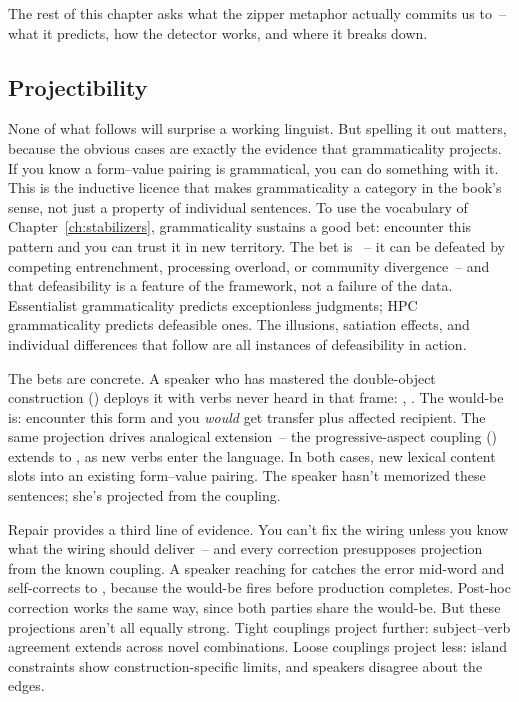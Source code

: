 The rest of this chapter asks what the zipper metaphor actually commits us to~-- what it predicts, how the detector works, and where it breaks down.


\subsection{Projectibility}
\label{sec:15:projectibility}
None of what follows will surprise a working linguist. But spelling it out matters, because the obvious cases are exactly the evidence that grammaticality projects. If you know a form--value pairing is grammatical, you can do something with it. This is the inductive licence that makes grammaticality a category in the book's sense, not just a property of individual sentences. To use the vocabulary of Chapter~\ref{ch:stabilizers}, grammaticality sustains a good bet: encounter this pattern and you can trust it in new territory. The bet is ~-- it can be defeated by competing entrenchment, processing overload, or community divergence~-- and that defeasibility is a feature of the framework, not a failure of the data. Essentialist grammaticality predicts exceptionless judgments; HPC grammaticality predicts defeasible ones. The illusions, satiation effects, and individual differences that follow are all instances of defeasibility in action.

The bets are concrete. A speaker who has mastered the double-object construction () deploys it with verbs never heard in that frame: , . The would-be is: encounter this form and you \emph{would} get transfer plus affected recipient. The same projection drives analogical extension~-- the progressive-aspect coupling () extends to ,  as new verbs enter the language. In both cases, new lexical content slots into an existing form--value pairing. The speaker hasn't memorized these sentences; she's projected from the coupling.

Repair provides a third line of evidence. You can't fix the wiring unless you know what the wiring should deliver~-- and every correction presupposes projection from the known coupling. A speaker reaching for  catches the error mid-word and self-corrects to , because the would-be fires before production completes. Post-hoc correction works the same way, since both parties share the would-be. But these projections aren't all equally strong. Tight couplings project further: subject--verb agreement extends across novel combinations. Loose couplings project less: island constraints show construction-specific limits, and speakers disagree about the edges.

